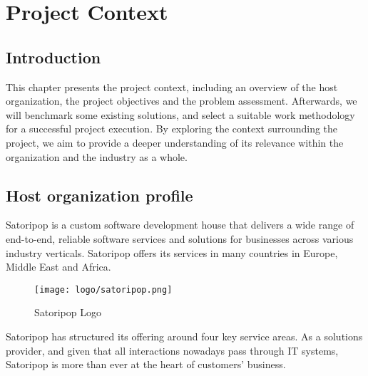\chapter{Project Context}
\section*{Introduction}
This chapter presents the project context, including an overview of the host organization,
the project objectives and the problem assessment. Afterwards, we will benchmark some existing
solutions, and select a suitable work methodology for a successful project execution.
By exploring the context surrounding the project, we aim to provide a deeper understanding of
its relevance within the organization and the industry as a whole.

\section{Host organization profile}

Satoripop is a custom software development house that delivers a wide range of end-to-end,
reliable software services and solutions for businesses across various industry verticals.
Satoripop offers its services in many countries in Europe, Middle East and Africa.

\begin{figure}[hbt!]
      \centering
      \texttt{[image: logo/satoripop.png]}
      \caption{Satoripop Logo}
      \label{fig:sp-logo}
\end{figure}

Satoripop has structured its offering around four key service areas. As a solutions provider,
and given that all interactions nowadays pass through IT systems, Satoripop is more than ever at the
heart of customers' business.

